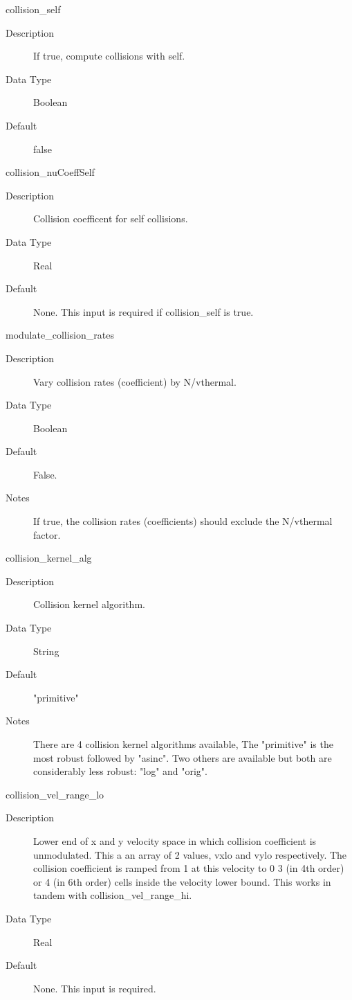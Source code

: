 \documentclass[11pt]{amsart}
\begin{document}
collision\_self
\begin{description}
\item [Description] If true, compute collisions with self.
\item [Data Type] Boolean
\item [Default] false
\end{description}

collision\_nuCoeffSelf
\begin{description}
\item [Description] Collision coefficent for self collisions.
\item [Data Type] Real
\item [Default] None.  This input is required if collision\_self is true.
\end{description}

modulate\_collision\_rates
\begin{description}
\item [Description] Vary collision rates (coefficient) by N/vthermal.
\item [Data Type] Boolean
\item [Default] False.
\item [Notes] If true, the collision rates (coefficients) should exclude the
N/vthermal factor.
\end{description}

collision\_kernel\_alg
\begin{description}
\item [Description] Collision kernel algorithm.
\item [Data Type] String
\item [Default] "primitive"
\item [Notes] There are 4 collision kernel algorithms available,  The
"primitive" is the most robust followed by "asinc".  Two others are available
but both are considerably less robust: "log" and "orig".
\end{description}

collision\_vel\_range\_lo
\begin{description}
\item [Description] Lower end of x and y velocity space in which collision
coefficient is unmodulated.  This a an array of 2 values, vxlo and vylo
respectively.  The collision coefficient is ramped from 1 at this velocity to 0
3 (in 4th order) or 4 (in 6th order) cells inside the velocity lower bound.
This works in tandem with collision\_vel\_range\_hi.
\item [Data Type] Real
\item [Default] None.  This input is required.
\end{description}
\end{document}
